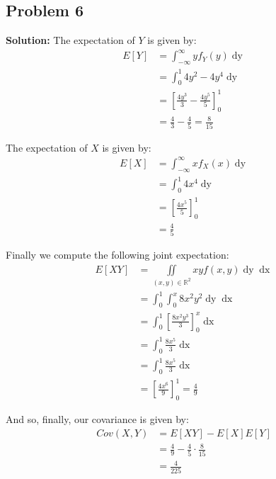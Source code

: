 \documentclass{article}
\newcommand*\eval[3]{\left[#1\right]_{#2}^{#3}}
\begin{document}
\subsection*{Problem 6}
\noindent\textbf{Solution:} The expectation of $Y$ is given by:
\begin{align*}
    E[Y]&=\int^\infty_{-\infty} yf_Y(y)\mathop{dy}\\
    &=\int_0^1 4y^2-4y^4\mathop{dy}\\
    &=\eval{\frac{4y^3}{3}-\frac{4y^5}{5}}{0}{1}\\
    &=\frac{4}{3}-\frac{4}{5}=\frac{8}{15}
\end{align*}

The expectation of $X$ is given by:
\begin{align*}
    E[X]&=\int^\infty_{-\infty} xf_X(x)\mathop{dy}\\
    &=\int_0^1 4x^4\mathop{dy}\\
    &=\eval{\frac{4x^5}{5}}{0}{1}\\
    &=\frac{4}{5}
\end{align*}

Finally we compute the following joint expectation:
\begin{align*}
    E[XY]&=\iint\limits_{(x,y)\in\mathbb R^2} xyf(x,y)\mathop{dy}\mathop{dx}\\
    &=\int_0^1\int_0^x 8x^2y^2\mathop{dy}\mathop{dx}\\
    &=\int_0^1\eval{\frac{8x^2y^3}{3}}{0}{x}\mathop{dx}\\
    &=\int_0^1\frac{8x^5}{3}\mathop{dx}\\
    &=\int_0^1\frac{8x^5}{3}\mathop{dx}\\
    &=\eval{\frac{4x^6}{9}}{0}{1}=\frac{4}{9}
\end{align*}

And so, finally, our covariance is given by:
\begin{align*}
    Cov(X,Y)&=E[XY]-E[X]E[Y]\\
    &=\frac{4}{9}-\frac{4}{5}\cdot\frac{8}{15}\\
    &=\frac{4}{225}
\end{align*}
\end{document}
